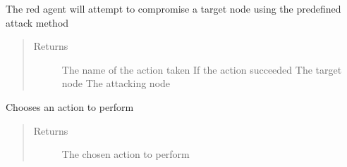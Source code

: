 \documentclass[letterpaper,10pt,english]{sphinxmanual}
\begin{document}
\begin{fulllineitems}
\begin{fulllineitems}
\label{\detokenize{source/yawning_titan.envs.generic.core:yawning_titan.envs.generic.core.red_action_set.RedActionSet.basic_attack}}
\sphinxAtStartPar
The red agent will attempt to compromise a target node using the predefined attack method
\begin{quote}\begin{description}
\item[{Returns}] \leavevmode
\sphinxAtStartPar
The name of the action taken
If the action succeeded
The target node
The attacking node

\end{description}\end{quote}

\end{fulllineitems}


\begin{fulllineitems}
\label{\detokenize{source/yawning_titan.envs.generic.core:yawning_titan.envs.generic.core.red_action_set.RedActionSet.choose_action}}
\sphinxAtStartPar
Chooses an action to perform
\begin{quote}\begin{description}
\item[{Returns}] \leavevmode
\sphinxAtStartPar
The chosen action to perform

\end{description}\end{quote}

\end{fulllineitems}



\end{fulllineitems}
\end{document}
